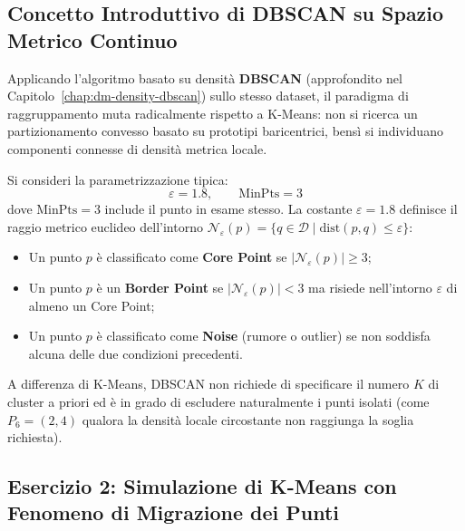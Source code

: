 \FloatBarrier
\subsection{Concetto Introduttivo di DBSCAN su Spazio Metrico Continuo}
\label{sec:dm-dbscan-simulation-intro}

Applicando l'algoritmo basato su densità \textbf{DBSCAN} (approfondito nel Capitolo~\ref{chap:dm-density-dbscan}) sullo stesso dataset, il paradigma di raggruppamento muta radicalmente rispetto a K-Means: non si ricerca un partizionamento convesso basato su prototipi baricentrici, bensì si individuano componenti connesse di densità metrica locale.

Si consideri la parametrizzazione tipica:
\begin{equation}
\varepsilon = 1.8, \qquad \text{MinPts} = 3
\end{equation}
dove $\text{MinPts} = 3$ include il punto in esame stesso.
La costante $\varepsilon = 1.8$ definisce il raggio metrico euclideo dell'intorno $\mathcal{N}_\varepsilon(p) = \{q \in \mathcal{D} \mid \mathrm{dist}(p, q) \le \varepsilon\}$:
\begin{itemize}
    \item Un punto $p$ è classificato come \textbf{Core Point} se $|\mathcal{N}_\varepsilon(p)| \ge 3$;
    \item Un punto $p$ è un \textbf{Border Point} se $|\mathcal{N}_\varepsilon(p)| < 3$ ma risiede nell'intorno $\varepsilon$ di almeno un Core Point;
    \item Un punto $p$ è classificato come \textbf{Noise} (rumore o outlier) se non soddisfa alcuna delle due condizioni precedenti.
\end{itemize}

A differenza di K-Means, DBSCAN non richiede di specificare il numero $K$ di cluster a priori ed è in grado di escludere naturalmente i punti isolati (come $P_6 = (2,4)$ qualora la densità locale circostante non raggiunga la soglia richiesta).

\FloatBarrier
\subsection{Esercizio 2: Simulazione di K-Means con Fenomeno di Migrazione dei Punti}
\label{sec:dm-kmeans-exercise-2}

